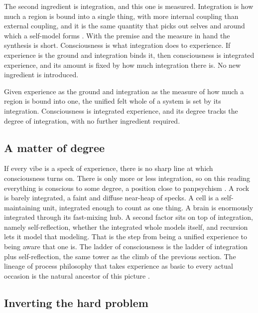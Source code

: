 The second ingredient is integration, and this one is measured. Integration is how much a region is bound into a
single thing, with more internal coupling than external coupling, and it is the same quantity that picks out
selves and around which a self-model forms \cite{pollard2026vibetest}. With the premise and the measure in hand the
synthesis is short. Consciousness is what integration does to experience. If experience is the ground and
integration binds it, then consciousness is integrated experience, and its amount is fixed by how much integration
there is. No new ingredient is introduced.

\begin{proposition}
Given experience as the ground and integration as the measure of how much a region is bound into one, the unified
felt whole of a system is set by its integration. Consciousness is integrated experience, and its degree tracks
the degree of integration, with no further ingredient required.
\end{proposition}

\subsection{A matter of degree}

If every vibe is a speck of experience, there is no sharp line at which consciousness turns on. There is only more
or less integration, so on this reading everything is conscious to some degree, a position close to panpsychism
\cite{strawson2006, goff2017}. A rock is barely integrated, a faint and diffuse near-heap of specks. A cell is a
self-maintaining unit, integrated enough to count as one thing. A brain is enormously integrated through its
fast-mixing hub. A second factor sits on top of integration, namely self-reflection, whether the integrated whole
models itself, and recursion lets it model that modeling. That is the step from being a unified experience to being
aware that one is. The ladder of consciousness is the ladder of integration plus self-reflection, the same tower as
the climb of the previous section. The lineage of process philosophy that takes experience as basic to every
actual occasion is the natural ancestor of this picture \cite{whitehead1929}.

\subsection{Inverting the hard problem}

